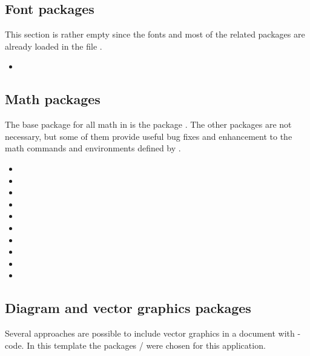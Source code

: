 
\subsection{Font packages}
This section is rather empty since the fonts and most of the related packages are already loaded in the file .

\begin{itemize}[noitemsep]
\item {}
\end{itemize}


\subsection{Math packages}
The base package for all math in \latex is the package . The other packages are not necessary, but some of them provide useful bug fixes and enhancement to the math commands and environments defined by .

\begin{itemize}[noitemsep]
\item {}
\item {}
\item {}
\item {}
\item {}
\item {}
\item {}
\item {}
\item {}
\item {}
\end{itemize}


\subsection{Diagram and vector graphics packages}
Several approaches are possible to include vector graphics in a \latex document with \latex-code. In this template the packages / were chosen for this application.

